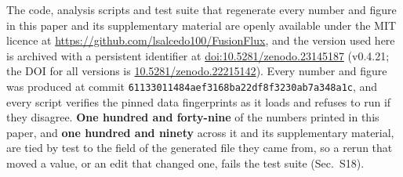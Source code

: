 \documentclass[aip,pop,preprint,amsmath,amssymb]{revtex4-2}
\begin{document}
\noindent The code, analysis scripts and test suite that regenerate every number
and figure in this paper and its supplementary material are openly available
under the MIT licence at \url{https://github.com/lsalcedo100/FusionFlux}, and
the version used here is archived with a persistent identifier\cite{zenodo} at
\href{https://doi.org/10.5281/zenodo.23145187}{doi:10.5281/zenodo.23145187}
(v0.4.21; the DOI for all versions is
\href{https://doi.org/10.5281/zenodo.22215142}{10.5281/zenodo.22215142}). Every
number and figure was produced at commit
\texttt{61133011484aef3168ba22df8f3230ab7a348a1c}, and every script verifies the
pinned data fingerprints as it loads and refuses to run if they disagree.
\textbf{One hundred and forty-nine} of the numbers printed in this paper, and
\textbf{one hundred and ninety} across it and its supplementary material, are tied by
test to the field of the generated file they came from, so a rerun that moved a
value, or an edit that changed one, fails the test suite (Sec.~S18).
\end{document}
